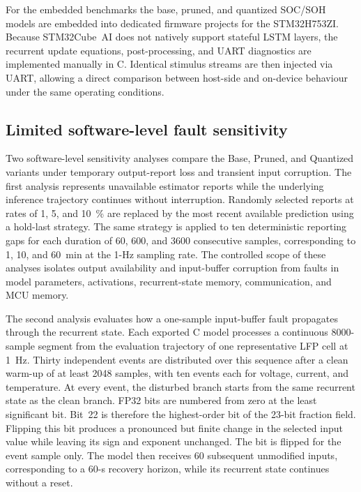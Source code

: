 \documentclass[final,3p,times]{elsarticle}
\begin{document}
For the embedded benchmarks the base, pruned, and quantized SOC/SOH models are embedded into dedicated firmware projects for the STM32H753ZI. Because STM32Cube~AI does not natively support stateful LSTM layers, the recurrent update equations, post-processing, and UART diagnostics are implemented manually in C. Identical stimulus streams are then injected via UART, allowing a direct comparison between host-side and on-device behaviour under the same operating conditions.

\subsection{Limited software-level fault sensitivity}
Two software-level sensitivity analyses compare the Base, Pruned, and Quantized variants under temporary output-report loss and transient input corruption. The first analysis represents unavailable estimator reports while the underlying inference trajectory continues without interruption. Randomly selected reports at rates of 1, 5, and 10~\% are replaced by the most recent available prediction using a hold-last strategy. The same strategy is applied to ten deterministic reporting gaps for each duration of 60, 600, and 3600 consecutive samples, corresponding to 1, 10, and 60~min at the 1-Hz sampling rate. The controlled scope of these analyses isolates output availability and input-buffer corruption from faults in model parameters, activations, recurrent-state memory, communication, and MCU memory.

The second analysis evaluates how a one-sample input-buffer fault propagates through the recurrent state. Each exported C model processes a continuous 8000-sample segment from the evaluation trajectory of one representative LFP cell at 1~Hz. Thirty independent events are distributed over this sequence after a clean warm-up of at least 2048 samples, with ten events each for voltage, current, and temperature. At every event, the disturbed branch starts from the same recurrent state as the clean branch. FP32 bits are numbered from zero at the least significant bit. Bit~22 is therefore the highest-order bit of the 23-bit fraction field. Flipping this bit produces a pronounced but finite change in the selected input value while leaving its sign and exponent unchanged. The bit is flipped for the event sample only. The model then receives 60 subsequent unmodified inputs, corresponding to a 60-s recovery horizon, while its recurrent state continues without a reset.
\end{document}
